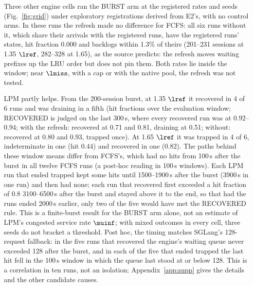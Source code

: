 Three other engine cells ran the BURST arm at the registered rates and seeds (Fig.~\ref{fig:grid}) under exploratory registrations derived from E2's, with no control arms. In these runs the refresh made no difference for FCFS: all six runs without it, which share their arrivals with the registered runs, have the registered runs' states, hit fraction 0.000 and backlogs within 1.3\% of theirs (201--231 sessions at 1.35 $\lref$, 282--328 at 1.65), as the source predicts: the refresh moves waiting prefixes up the LRU order but does not pin them. Both rates lie inside the window; near $\lmiss$, with a cap or with the native pool, the refresh was not tested.

LPM partly helps. From the 200-session burst, at 1.35 $\lref$ it recovered in 4 of 6 runs and was draining in a fifth (hit fractions over the evaluation window; RECOVERED is judged on the last 300\,s, where every recovered run was at 0.92--0.94; with the refresh: recovered at 0.71 and 0.81, draining at 0.51; without: recovered at 0.80 and 0.93, trapped once). At 1.65 $\lref$ it was trapped in 4 of 6, indeterminate in one (hit 0.44) and recovered in one (0.82). The paths behind these window means differ from FCFS's, which had no hits from 100\,s after the burst in all twelve FCFS runs (a post-hoc reading in 100\,s windows). Each LPM run that ended trapped kept some hits until 1500--1900\,s after the burst (3900\,s in one run) and then had none; each run that recovered first exceeded a hit fraction of 0.8 3100--6500\,s after the burst and stayed above it to the end, so that had the runs ended 2000\,s earlier, only two of the five would have met the RECOVERED rule. This is a finite-burst result for the BURST arm alone, not an estimate of LPM's congested service rate $\muinf$; with mixed outcomes in every cell, three seeds do not bracket a threshold. Post hoc, the timing matches SGLang's 128-request fallback: in the five runs that recovered the engine's waiting queue never exceeded 128 after the burst, and in each of the five that ended trapped the last hit fell in the 100\,s window in which the queue last stood at or below 128. This is a correlation in ten runs, not an isolation; Appendix~\ref{app:supp} gives the details and the other candidate causes.


